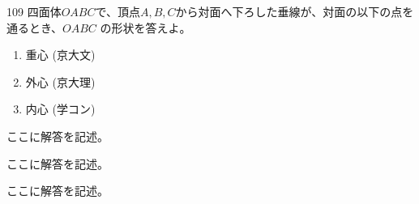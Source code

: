 \begin{prob}{109}{}{}
 四面体$OABC$で、頂点$A, B, C$から対面へ下ろした垂線が、対面の以下の点を通るとき、$OABC$ の形状を答えよ。
 \begin{enumerate}
  \item 重心  (京大文)
  \item 外心  (京大理)
  \item 内心  (学コン)
 \end{enumerate}
\end{prob}

ここに解答を記述。

ここに解答を記述。

ここに解答を記述。